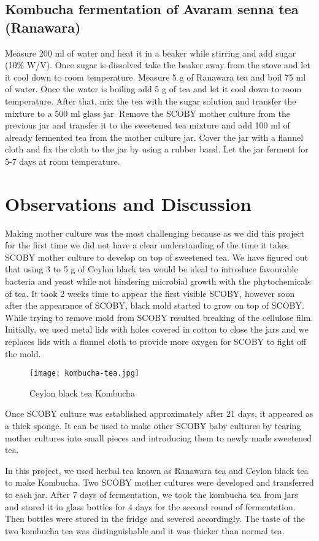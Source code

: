 \documentclass[12pt]{article}
\begin{document}
\subsection{ Kombucha fermentation of Avaram senna tea (Ranawara)}

Measure 200 ml of water and heat it in a beaker while stirring and add sugar (10\% W/V). Once sugar is dissolved take the beaker away from the stove and let it cool down to room temperature. Measure 5 g of Ranawara tea and boil 75 ml of water. Once the water is boiling add 5 g of tea and let it cool down to room temperature. After that, mix the tea with the sugar solution and transfer the mixture to a 500 ml glass jar.  Remove the SCOBY mother culture from the previous jar and transfer it to the sweetened tea mixture and add 100 ml of already fermented tea from the mother culture jar. Cover the jar with a flannel cloth and fix the cloth to the jar by using a rubber band. Let the jar ferment for 5-7 days at room temperature. 



        \section{Observations and Discussion}
Making mother culture was the most challenging because as we did this project for the first time we did not have a clear understanding of the time it takes SCOBY mother culture to develop on top of sweetened tea. We have figured out that using 3 to 5 g of Ceylon black tea would be ideal to introduce favourable bacteria and yeast while not hindering microbial growth with the phytochemicals of tea.  It took 2 weeks time to appear the first visible SCOBY, however soon after the appearance of SCOBY, black mold started to grow on top of SCOBY.  While trying to remove mold from SCOBY resulted breaking of the cellulose film. Initially, we used metal lids with holes covered in cotton to close the jars and we replaces lids with a flannel cloth to provide more oxygen for SCOBY to fight off the mold.

    

        \begin{figure}[ht]
\centering
\texttt{[image: kombucha-tea.jpg]}
\caption{Ceylon black tea Kombucha}
\label{fig:view}
\end{figure}

Once SCOBY culture was established approximately after 21 days, it appeared as a thick sponge. It can be used to make other SCOBY baby cultures by tearing mother cultures into small pieces and introducing them to newly made sweetened tea. 

In this project, we used herbal tea known as Ranawara tea and  Ceylon black tea to make Kombucha. Two  SCOBY mother cultures were developed and transferred to each jar. After 7 days of fermentation, we took the kombucha tea from jars and stored it in glass bottles for 4 days for the second round of fermentation. Then bottles were stored in the fridge and severed accordingly. The taste of the two kombucha tea was distinguishable and it was thicker than normal tea. 



            	
    
\end{document}
